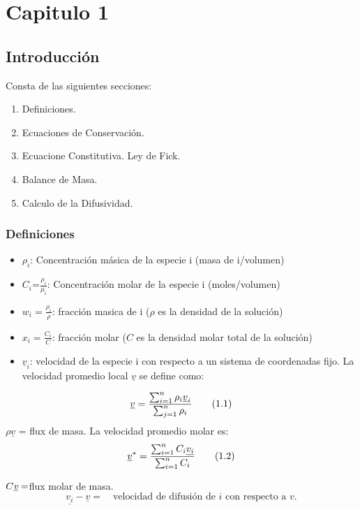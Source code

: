 \chapter{Capitulo 1}
\section{Introducción}Consta de las siguientes secciones:
 	\begin{enumerate}
 		 \item Definiciones. 
 		 \item Ecuaciones de Conservación.
 		  \item Ecuacione Constitutiva. Ley de Fick.
 		   \item Balance de Masa. 
 		   \item Calculo de la Difusividad. 
 	   \end{enumerate} 
 	   \subsection{Definiciones} 
 	   \begin{itemize}
 	  \item \emph{$\rho_i$}: Concentración másica de la especie i (masa de i/volumen)
 	  \item $C_i$=$\frac{\rho_i}{\mu_i}$: Concentración molar de la especie i (moles/volumen)
 	  \item $w_i=\frac{\rho_i}{\rho}$: fracción masica de i ($\rho$ es la densidad de la solución)
 	  \item $x_i=\frac{C_i}{C}$: fracción molar ($C$ es la densidad molar total de la solución)
 	  \item \emph{$ \underline{v}_i$}: velocidad de la especie i con respecto a un sistema de coordenadas fijo. La velocidad promedio local \emph{$ \underline{v}$} se define como:
 	 \end{itemize}
 	 \begin{equation}
 	 \emph{$ \underline{v}=\frac{\sum_{i=1}^n \rho_i  \underline{v}_i}{\sum_{j=1}^n \rho_i}$}
 	 \tag{1.1}
     \label{eq_1.1}
 	  \end{equation}
 	  \emph{$\rho  \underline{v}$} = flux de masa. La velocidad promedio molar es:
 	   \begin{equation}
 	  	\emph{$ \underline{v}^*=\frac{\sum_{i=1}^n C_i  \underline{v_i}}{\sum_{i=1}^n C_i}$}
 	  	\tag{1.2}
        \label{eq_1.2}
 	  \end{equation}
 	
$C\underline{\emph{v}}=$flux molar de masa.
 \begin{equation}
 \underline{	{v}_i} -\underline{{v} }=\quad \text{velocidad de difusión de $i$ con respecto a ${v}$}. \tag{1.3}
 \label{eq_1.3}
 \end{equation}
 
